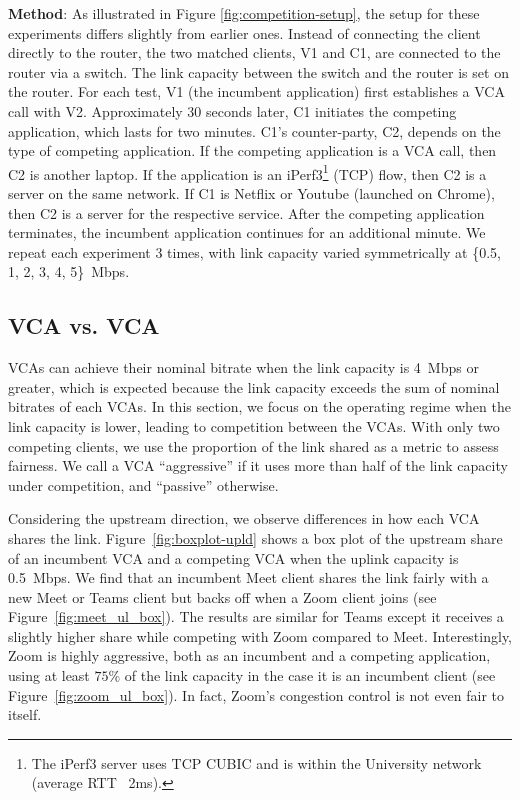 \noindent \textbf{Method}: As illustrated in Figure \ref{fig:competition-setup}, the setup for these experiments differs slightly from earlier ones. 
Instead of connecting the client directly to the router, the two matched clients, V1 and C1, are connected to the router via a switch. 
The link capacity between the switch and the router is set on the router. For each test, V1 (the incumbent application) first establishes a VCA call with V2.
Approximately 30 seconds later, C1 initiates the competing application, which lasts for two minutes.
C1's counter-party, C2, depends on the type of competing application.
If the competing application is a VCA call, then C2 is another laptop.
If the application is an iPerf3\footnote{The iPerf3 server uses TCP CUBIC and is  within the University network (average RTT ~2ms).} (TCP) flow, then C2 is a server on the same network.
  If C1 is Netflix or Youtube (launched on Chrome), then C2 is a server for the respective service. 
After the competing application terminates, the incumbent application continues for an additional minute.
We repeat each experiment 3 times, with link capacity varied symmetrically at \{0.5, 1, 2, 3, 4, 5\}~Mbps.

\subsection{VCA vs. VCA}

VCAs can achieve their nominal bitrate when the link capacity is
4~Mbps or greater, which is expected because the link capacity exceeds the sum of
nominal bitrates of each VCAs.  In this section, we focus on the 
operating regime when the link capacity is lower, leading to competition between the VCAs. 
With only two competing clients, we use the proportion of the link shared as a
metric to assess fairness. We call a VCA ``aggressive'' if it uses more than
half of the link capacity under competition, and ``passive'' otherwise.

Considering the upstream direction, we observe differences in how each VCA shares the
link. Figure~\ref{fig:boxplot-upld} shows a box plot of the upstream share of
an incumbent VCA and a competing VCA when the uplink capacity is 0.5~Mbps.  We
find that an incumbent Meet client shares the link fairly with a new Meet or
Teams client but backs off when a Zoom client joins (see
Figure~\ref{fig:meet_ul_box}). The results are similar for Teams except it
receives a slightly higher share while competing with Zoom compared to Meet.
Interestingly, Zoom is highly aggressive, both as an incumbent and a competing
application, using at least $75\%$ of the link capacity in the case it is an
incumbent client (see Figure~\ref{fig:zoom_ul_box}). In fact, Zoom's
congestion control is not even fair to itself.

